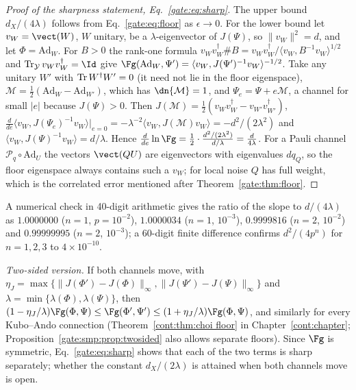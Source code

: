 \begin{proof}[Proof of the sharpness statement, Eq.~\eqref{gate:eq:sharp}]
The upper bound $d_X/(4\lambda)$ follows from Eq.~\eqref{gate:eq:floor} as $\epsilon\to0$. For the lower bound let $v_W=\vect(W)$, $W$ unitary, be a $\lambda$-eigenvector of $J(\Psi)$, so $\|v_W\|^2=d$, and let $\Phi=\mathrm{Ad}_W$. For $B>0$ the rank-one formula $v_Wv_W^\dagger\#B=v_Wv_W^\dagger/\langle v_W,B^{-1}v_W\rangle^{1/2}$ and $\Tr_{\mathcal Y}v_Wv_W^\dagger=\Id$ give $\Fg(\mathrm{Ad}_W,\Psi')=\langle v_W,J(\Psi')^{-1}v_W\rangle^{-1/2}$. Take any unitary $W'$ with $\operatorname{Tr} W^\dagger W'=0$ (it need not lie in the floor eigenspace), $\mathcal M=\frac12(\mathrm{Ad}_W-\mathrm{Ad}_{W'})$, which has $\dn{\mathcal M}=1$, and $\Psi_e=\Psi+e\mathcal M$, a channel for small $|e|$ because $J(\Psi)>0$. Then $J(\mathcal M)=\frac12(v_Wv_W^\dagger-v_{W'}v_{W'}^\dagger)$, $\frac{d}{de}\langle v_W,J(\Psi_e)^{-1}v_W\rangle|_{e=0}=-\lambda^{-2}\langle v_W,J(\mathcal M)v_W\rangle=-d^2/(2\lambda^2)$ and $\langle v_W,J(\Psi)^{-1}v_W\rangle=d/\lambda$. Hence $\frac{d}{de}\ln\Fg=\frac12\cdot\frac{d^2/(2\lambda^2)}{d/\lambda}=\frac{d}{4\lambda}$. For a Pauli channel $\mathcal P_q\circ\mathrm{Ad}_U$ the vectors $\vect(QU)$ are eigenvectors with eigenvalues $dq_Q$, so the floor eigenspace always contains such a $v_W$; for local noise $Q$ has full weight, which is the correlated error mentioned after Theorem~\ref{gate:thm:floor}.
\end{proof}

A numerical check in 40-digit arithmetic gives the ratio of the slope to $d/(4\lambda)$ as $1.0000000$ ($n=1$, $p=10^{-2}$), $1.0000034$ ($n=1$, $10^{-3}$), $0.9999816$ ($n=2$, $10^{-2}$) and $0.99999995$ ($n=2$, $10^{-3}$); a 60-digit finite difference confirms $d^2/(4p^n)$ for $n=1,2,3$ to $4\times10^{-10}$.

\emph{Two-sided version.} If both channels move, with $\eta_J=\max\{\|J(\Phi')-J(\Phi)\|_\infty,\|J(\Psi')-J(\Psi)\|_\infty\}$ and $\lambda=\min\{\lambda(\Phi),\lambda(\Psi)\}$, then $(1-\eta_J/\lambda)\Fg(\Phi,\Psi)\le\Fg(\Phi',\Psi')\le(1+\eta_J/\lambda)\Fg(\Phi,\Psi)$, and similarly for every Kubo--Ando connection (Theorem~\ref{cont:thm:choi floor} in Chapter~\ref{cont:chapter}; Proposition~\ref{gate:smp:prop:twosided} also allows separate floors). Since $\Fg$ is symmetric, Eq.~\eqref{gate:eq:sharp} shows that each of the two terms is sharp separately; whether the constant $d_X/(2\lambda)$ is attained when both channels move is open.

